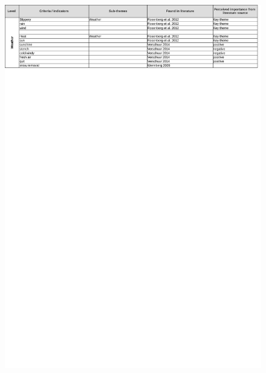 \begin{appendix}
\begin{figure}[h]
\includegraphics[width=\textwidth]{img/annex/A5_weather_criteria.pdf}
\end{figure}
\begin{figure}[h]

\end{figure}
\end{appendix}
